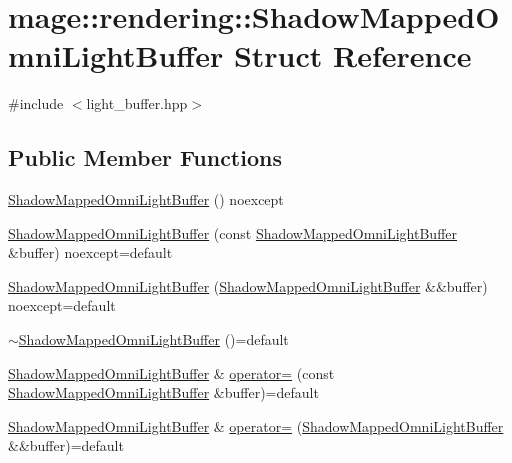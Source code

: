 \hypertarget{structmage_1_1rendering_1_1_shadow_mapped_omni_light_buffer}{}\section{mage\+:\+:rendering\+:\+:Shadow\+Mapped\+Omni\+Light\+Buffer Struct Reference}
\label{structmage_1_1rendering_1_1_shadow_mapped_omni_light_buffer}


{\ttfamily \#include $<$light\+\_\+buffer.\+hpp$>$}

\subsection*{Public Member Functions}
\begin{DoxyCompactItemize}
\item 
\mbox{\hyperlink{structmage_1_1rendering_1_1_shadow_mapped_omni_light_buffer_a3b9f6ffd582185ea739410aeeec8a446}{Shadow\+Mapped\+Omni\+Light\+Buffer}} () noexcept
\item 
\mbox{\hyperlink{structmage_1_1rendering_1_1_shadow_mapped_omni_light_buffer_a42ed551f04a7c53200e68e45c5ab9be5}{Shadow\+Mapped\+Omni\+Light\+Buffer}} (const \mbox{\hyperlink{structmage_1_1rendering_1_1_shadow_mapped_omni_light_buffer}{Shadow\+Mapped\+Omni\+Light\+Buffer}} \&buffer) noexcept=default
\item 
\mbox{\hyperlink{structmage_1_1rendering_1_1_shadow_mapped_omni_light_buffer_a7fb986d0697bdea8ac54f45c188f2a4b}{Shadow\+Mapped\+Omni\+Light\+Buffer}} (\mbox{\hyperlink{structmage_1_1rendering_1_1_shadow_mapped_omni_light_buffer}{Shadow\+Mapped\+Omni\+Light\+Buffer}} \&\&buffer) noexcept=default
\item 
\mbox{\hyperlink{structmage_1_1rendering_1_1_shadow_mapped_omni_light_buffer_afd9afa7796bbca38082cc8364f7c474c}{$\sim$\+Shadow\+Mapped\+Omni\+Light\+Buffer}} ()=default
\item 
\mbox{\hyperlink{structmage_1_1rendering_1_1_shadow_mapped_omni_light_buffer}{Shadow\+Mapped\+Omni\+Light\+Buffer}} \& \mbox{\hyperlink{structmage_1_1rendering_1_1_shadow_mapped_omni_light_buffer_ae43119f667592aea06f73532a9c9b742}{operator=}} (const \mbox{\hyperlink{structmage_1_1rendering_1_1_shadow_mapped_omni_light_buffer}{Shadow\+Mapped\+Omni\+Light\+Buffer}} \&buffer)=default
\item 
\mbox{\hyperlink{structmage_1_1rendering_1_1_shadow_mapped_omni_light_buffer}{Shadow\+Mapped\+Omni\+Light\+Buffer}} \& \mbox{\hyperlink{structmage_1_1rendering_1_1_shadow_mapped_omni_light_buffer_a5605852385a384c28a4c0cee6bc3cc32}{operator=}} (\mbox{\hyperlink{structmage_1_1rendering_1_1_shadow_mapped_omni_light_buffer}{Shadow\+Mapped\+Omni\+Light\+Buffer}} \&\&buffer)=default
\end{DoxyCompactItemize}
